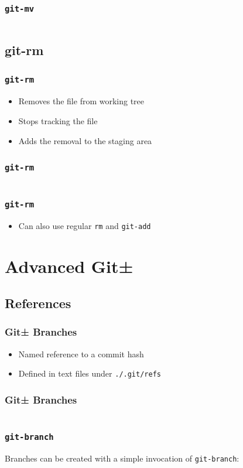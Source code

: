 \documentclass[]{beamer}
\begin{document}
\begin{frame}
\frametitle{\texttt{git-mv}}
\inputminted{bash}{code/4/3}
\end{frame}

\subsection{git-rm}
\begin{frame}
\frametitle{\texttt{git-rm}}
\begin{itemize}
\item{Removes the file from working tree}
\item{Stops tracking the file}
\item{Adds the removal to the staging area}
\end{itemize}
\end{frame}

\begin{frame}[fragile]
\frametitle{\texttt{git-rm}}
\inputminted{bash}{code/4/4}
\end{frame}

\begin{frame}
\frametitle{\texttt{git-rm}}
\begin{itemize}
\item{Can also use regular \texttt{rm} and \texttt{git-add}}
\end{itemize}
\end{frame}

\section{Advanced Git±}
\subsection{References}
\begin{frame}
\frametitle{Git± Branches}
\begin{itemize}
\item<2->{Named reference to a commit hash}
\item<3->{Defined in text files under \texttt{./.git/refs}}
\end{itemize}
\end{frame}

\begin{frame}[fragile]
\frametitle{Git± Branches}
\inputminted{bash}{code/5/1}
\end{frame}

\begin{frame}[fragile]
\frametitle{\texttt{git-branch}}
Branches can be created with a simple invocation of \texttt{git-branch}:
\inputminted{bash}{code/5/2}
\end{frame}
\end{document}
